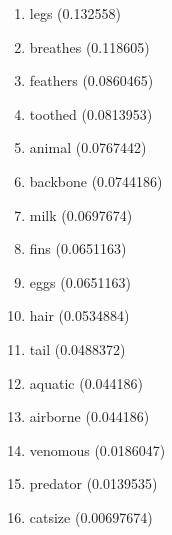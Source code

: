 \begin{enumerate}
\item legs (0.132558)
\item breathes (0.118605)
\item feathers (0.0860465)
\item toothed (0.0813953)
\item animal (0.0767442)
\item backbone (0.0744186)
\item milk (0.0697674)
\item fins (0.0651163)
\item eggs (0.0651163)
\item hair (0.0534884)
\item tail (0.0488372)
\item aquatic (0.044186)
\item airborne (0.044186)
\item venomous (0.0186047)
\item predator (0.0139535)
\item catsize (0.00697674)
\end{enumerate}